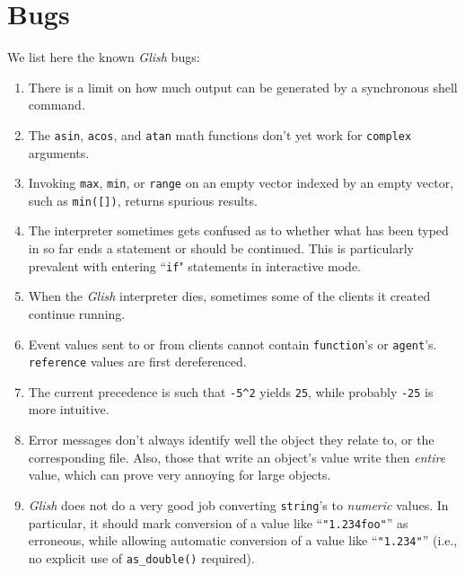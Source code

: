 
\chapter{Bugs} \label{bugs}

We list here the known \emph{Glish} bugs:
\begin{enumerate}

\item There is a limit on how much output can be generated by a
synchronous shell command.

\item The \texttt{asin}, \texttt{acos}, and \texttt{atan} math functions don't
yet work for \texttt{complex} arguments.

\item Invoking \texttt{max}, \texttt{min}, or \texttt{range} on an empty
vector indexed by an empty vector, such as \texttt{min([])}, returns
spurious results.

\item The interpreter sometimes gets confused as to whether what
has been typed in so far ends a statement or should be continued.
This is particularly prevalent with entering ``\texttt{if}" statements
in interactive mode.

\item When the \emph{Glish} interpreter dies, sometimes some of the clients it
created continue running.

\item Event values sent to or from clients cannot contain \texttt{function}'s
or \texttt{agent}'s.  \texttt{reference} values are first dereferenced.

\item The current precedence is such that \verb+-5^2+ yields \texttt{25},
while probably \texttt{-25} is more intuitive.

\item Error messages don't always identify well the object they
relate to, or the corresponding file.  Also, those that write an
object's value write then \emph{entire} value, which can prove very
annoying for large objects.

\item \emph{Glish} does not do a very good job converting \texttt{string}'s to
\emph{numeric} values.  In particular, it should mark conversion of
a value like ``\texttt{"1.234foo"}'' as erroneous, while allowing
automatic conversion of a value like ``\texttt{"1.234"}'' (i.e.,
no explicit use of \texttt{as\_double()} required).


\end{enumerate}
